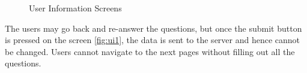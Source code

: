 \begin{figure}[htp]
  \hspace{2em}
  \caption{User Information Screens}
  \label{fig:ui}
\end{figure}

The users may go back and re-answer the questions, but once the submit button is pressed on the screen \ref{fig:ui1}, the data is sent to the server
and hence cannot be changed. Users cannot navigate to the next pages without filling out all the questions.

